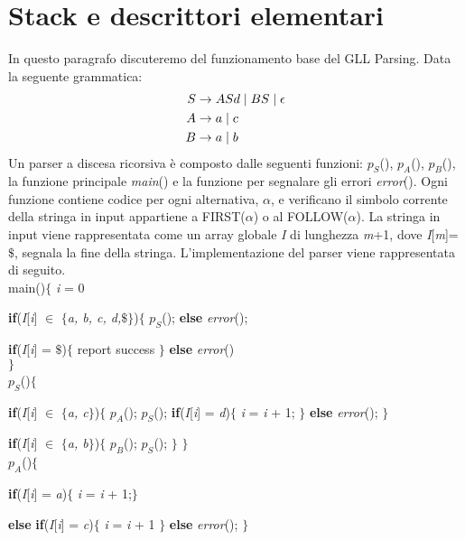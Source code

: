 \section{Stack e descrittori elementari}\label{par1}
In questo paragrafo discuteremo del funzionamento base del GLL Parsing. Data la seguente grammatica:
\begin{align}\label{gram3}
	S & \to ASd \mid BS \mid \epsilon \notag \\
	A & \to a \mid c \notag \\
	B & \to a \mid b 
\end{align}
Un parser a discesa ricorsiva \cite{pubblicazione: scott} è composto dalle seguenti funzioni: $p_S$(), $p_A$(), $p_B$(), la funzione principale \textit{main}() e la funzione per segnalare gli errori \textit{error}(). Ogni funzione contiene codice per ogni alternativa, $\alpha$, e verificano il simbolo corrente della stringa in input appartiene a FIRST($\alpha$) o al FOLLOW($\alpha$). La stringa in input viene rappresentata come un array globale \textit{I} di lunghezza \textit{m}+1, dove \textit{I}[\textit{m}]=$\$$, segnala la fine della stringa. L'implementazione del parser viene rappresentata di seguito.\\
main()$\{$ \textit{i} = 0 \par
\hspace{1cm}\textbf{if}(\textit{I}[\textit{i}] $\in$ $\{$\textit{a, b, c, d,$\$$}$\}$)$\{$ $p_S$(); \textbf{else} \textit{error}();\par
\hspace{1cm}\textbf{if}(\textit{I}[\textit{i}] = $\$$)$\{$ report success $\}$ \textbf{else} \textit{error}()\\	
$\}$\\
$p_S$()$\{$ \par
\hspace{0.5cm}\textbf{if}(\textit{I}[\textit{i}] $\in$ $\{$\textit{a, c}$\}$)$\{$ $p_A$(); $p_S$(); \textbf{if}(\textit{I}[\textit{i}] = \textit{d})$\{$ \textit{i} = \textit{i} + 1; $\}$ \textbf{else} \textit{error}(); $\}$\par
\hspace{0.5cm}\textbf{if}(\textit{I}[\textit{i}] $\in$ $\{$\textit{a, b}$\}$)$\{$ $p_B$(); $p_S$(); $\}$ $\}$\\
$p_A$()$\{$ \par
\hspace{0.5cm}\textbf{if}(\textit{I}[\textit{i}] = \textit{a})$\{$ \textit{i} = \textit{i} + 1;$\}$\par \hspace{0.5cm}\textbf{else} \textbf{if}(\textit{I}[\textit{i}] = \textit{c})$\{$ \textit{i} = \textit{i} + 1 $\}$ \textbf{else} \textit{error}(); $\}$\\
